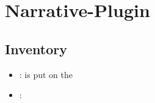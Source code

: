\chapter{Narrative-Plugin}
    \section{Inventory}
        \begin{itemize}
            \item {}: is put on the 
            \item {}: 
        \end{itemize}